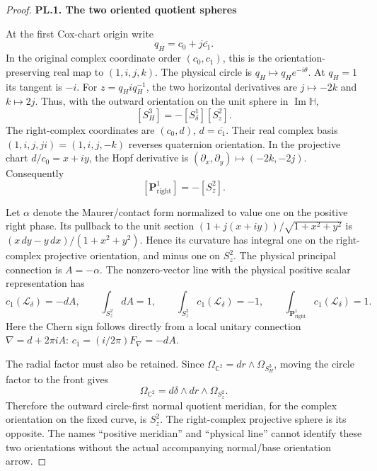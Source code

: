 \begin{proof}
\par

\medskip\noindent\textbf{PL.1. The two oriented quotient spheres}

\par\nopagebreak[4]

At the first Cox-chart origin write
\[
 q_H=c_0+j\overline{c_1}.
\]
In the original complex coordinate order \((c_0,c_1)\), this is the
orientation-preserving real map to \((1,i,j,k)\). The physical circle is
\(q_H\mapsto q_He^{-i\theta}\). At \(q_H=1\) its tangent is \(-i\).
For \(z=q_H i q_H^{-1}\), the two horizontal derivatives are
\(j\mapsto-2k\) and \(k\mapsto2j\). Thus, with the outward orientation
on the unit sphere in \(\operatorname{Im}\mathbb H\),
\[
 [S^3_H]=-[S^1_\delta][S^2_z].
\]
The right-complex coordinates are \((c_0,d)\), \(d=\overline{c_1}\).
Their real complex basis \((1,i,j,ji)=(1,i,j,-k)\) reverses quaternion
orientation. In the projective chart \(d/c_0=x+iy\), the Hopf derivative
is \((\partial_x,\partial_y)\mapsto(-2k,-2j)\). Consequently
\[
 [\mathbf P^1_{\mathrm{right}}]=-[S^2_z].
\]

Let \(\alpha\) denote the Maurer/contact form normalized to value one
on the positive right phase. Its pullback to the unit section
\((1+j(x+iy))/\sqrt{1+x^2+y^2}\) is
\((x\,dy-y\,dx)/(1+x^2+y^2)\). Hence its curvature has integral one
on the right-complex projective orientation, and minus one on \(S^2_z\).
The physical principal connection is \(A=-\alpha\). The nonzero-vector
line with the physical positive scalar representation has
\[
 c_1(\mathcal L_\delta)=-dA,\qquad
 \int_{S^2_z}dA=1,\qquad
 \int_{S^2_z}c_1(\mathcal L_\delta)=-1,
 \qquad
 \int_{\mathbf P^1_{\mathrm{right}}}c_1(\mathcal L_\delta)=1.
\]
Here the Chern sign follows directly from a local unitary connection
\(\nabla=d+2\pi iA\): \(c_1=(i/2\pi)F_\nabla=-dA\).

The radial factor must also be retained. Since
\(\Omega_{\mathbb C^2}=dr\wedge\Omega_{S^3_H}\), moving the circle
factor to the front gives
\[
 \Omega_{\mathbb C^2}=d\delta\wedge dr\wedge\Omega_{S^2_z}.
\]
Therefore the outward circle-first normal quotient meridian, for the
complex orientation on the fixed curve, is \(S^2_z\). The right-complex
projective sphere is its opposite. The names ``positive meridian'' and
``physical line'' cannot identify these two orientations without the
actual accompanying normal/base orientation arrow.

\par


\end{proof}
